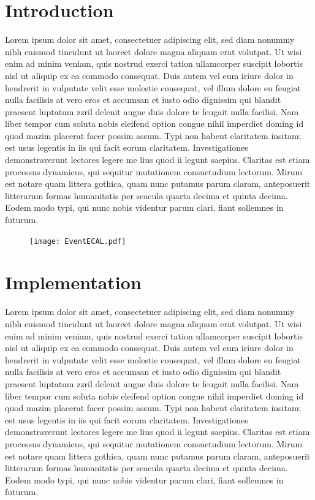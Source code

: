 \documentclass[final,3p,times,twocolumn]{elsarticle}
\begin{document}
\linenumbers 

 
\section{Introduction}
Lorem ipsum dolor sit amet, consectetuer adipiscing elit, sed diam nonummy nibh euismod tincidunt ut laoreet dolore magna aliquam erat volutpat. Ut wisi enim ad minim veniam, quis
nostrud exerci tation ullamcorper suscipit lobortis nisl ut aliquip ex ea commodo consequat. Duis autem vel eum iriure dolor in hendrerit in vulputate velit esse molestie consequat,
vel illum dolore eu feugiat nulla facilisis at vero eros et accumsan et iusto odio dignissim qui blandit praesent luptatum zzril delenit augue duis dolore te feugait nulla facilisi.
Nam liber tempor cum soluta nobis eleifend option congue nihil imperdiet doming id quod mazim placerat facer possim assum. Typi non habent claritatem insitam; est usus legentis in
iis qui facit eorum claritatem. Investigationes demonstraverunt lectores legere me lius quod ii legunt saepius. Claritas est etiam processus dynamicus, qui sequitur mutationem
consuetudium lectorum. Mirum est notare quam littera gothica, quam nunc putamus parum claram, anteposuerit litterarum formas humanitatis per seacula quarta decima et quinta
decima. Eodem modo typi, qui nunc nobis videntur parum clari, fiant sollemnes in futurum.

\begin{figure}[!h]
  \begin{center}
     \texttt{[image: EventECAL.pdf]}
     \caption{\label{}}
  \end{center}
\end{figure}

\section{Implementation}
Lorem ipsum dolor sit amet, consectetuer adipiscing elit, sed diam nonummy nibh euismod tincidunt ut laoreet dolore magna aliquam erat volutpat. Ut wisi enim ad minim veniam, quis
nostrud exerci tation ullamcorper suscipit lobortis nisl ut aliquip ex ea commodo consequat. Duis autem vel eum iriure dolor in hendrerit in vulputate velit esse molestie consequat,
vel illum dolore eu feugiat nulla facilisis at vero eros et accumsan et iusto odio dignissim qui blandit praesent luptatum zzril delenit augue duis dolore te feugait nulla facilisi.
Nam liber tempor cum soluta nobis eleifend option congue nihil imperdiet doming id quod mazim placerat facer possim assum. Typi non habent claritatem insitam; est usus legentis in
iis qui facit eorum claritatem. Investigationes demonstraverunt lectores legere me lius quod ii legunt saepius. Claritas est etiam processus dynamicus, qui sequitur mutationem
consuetudium lectorum. Mirum est notare quam littera gothica, quam nunc putamus parum claram, anteposuerit litterarum formas humanitatis per seacula quarta decima et quinta
decima. Eodem modo typi, qui nunc nobis videntur parum clari, fiant sollemnes in futurum.
\end{document}
